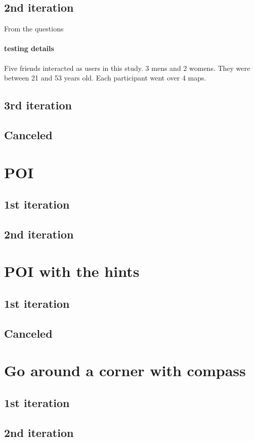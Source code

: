 			\subsection{2nd iteration}
				From the questions
				
				\paragraph{testing details}
				Five friends interacted as users in this study. 3 mens and 2 womens. They were between 21 and 53 years old. Each participant went over 4 maps.
			\subsection{3rd iteration}		
			\subsection{Canceled}
		\section{POI}		
			\subsection{1st iteration}
			\subsection{2nd iteration}		
		\section{POI with the hints}
			\subsection{1st iteration}
			\subsection{Canceled}	
		\section{Go around a corner with compass}
			\subsection{1st iteration}
			\subsection{2nd iteration}
